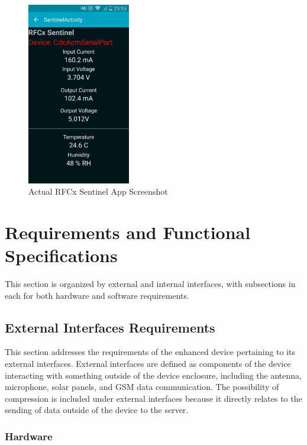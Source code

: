 \documentclass{article}
\numberwithin{figure}{section}
\numberwithin{equation}{section}
\begin{document}
{\begin{figure}[H]
	\centering
	\includegraphics[width=0.4\textwidth]{RFCxSentinelScreenshot}
	\caption{Actual RFCx Sentinel App Screenshot}
	\label{fig:sentscrn}
\end{figure}
\newpage

\section{Requirements and Functional Specifications} \label{sect:requirementsandspec}
This section is organized by external and internal interfaces, with subsections in each for both hardware and software requirements.

\subsection{External Interfaces Requirements} \label{sect:externinterface}
This section addresses the requirements of the enhanced device pertaining to its external interfaces. External interfaces are defined as components of the device interacting with something outside of the device enclosure, including the antenna, microphone, solar panels, and GSM data communication. The possibility of compression is included under external interfaces because it directly relates to the sending of data outside of the device to the server.

\subsubsection{Hardware} \label{sect:hardware1}
\begin{enumerate}[align=left,leftmargin=*, labelindent= 0em, label=\textbf{Requirement \thesubsubsection.\arabic*.}, itemindent=0em]


\end{enumerate}}
\end{document}
